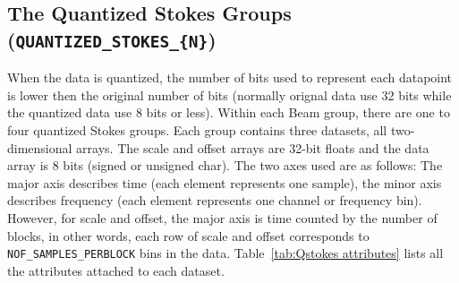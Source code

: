 \documentclass[a4paper,10pt,bibtotoc]{scrartcl}
\begin{document}

\subsection{The Quantized Stokes Groups ({\tt QUANTIZED\_STOKES\_\{N\}})}
\label{sec:QuantizedStokes}

When the data is quantized, the number of bits used to represent each datapoint is lower then the original number of bits (normally orignal data use 32 bits while the quantized data use 8 bits or less).
Within each Beam group, there are one to four quantized Stokes groups. Each group contains three datasets, all two-dimensional arrays. The scale and offset arrays are 32-bit floats and the data array is 8 bits (signed or unsigned char).  The two axes used are as follows: The major axis describes time (each element represents one sample), the minor axis describes frequency (each element represents one channel or frequency bin). However, for scale and offset, the major axis is time counted by the number of blocks, in other words, each row of scale and offset corresponds to \verb|NOF_SAMPLES_PERBLOCK| bins in the data. Table~\ref{tab:Qstokes attributes} lists all the attributes attached to each dataset.
\end{document}
